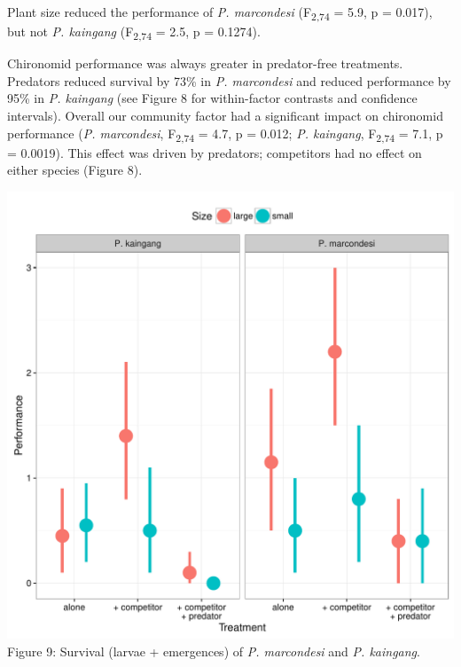 Plant size reduced the performance of \emph{P. marcondesi}
(F\textsubscript{2,74} = 5.9, p = 0.017), but not \emph{P. kaingang}
(F\textsubscript{2,74} = 2.5, p = 0.1274).

Chironomid performance was always greater in predator-free treatments.
Predators reduced survival by 73\% in \emph{P. marcondesi} and reduced
performance by 95\% in \emph{P. kaingang} (see Figure 8 for
within-factor contrasts and confidence intervals). Overall our community
factor had a significant impact on chironomid performance (\emph{P.
marcondesi}, F\textsubscript{2,74} = 4.7, p = 0.012; \emph{P. kaingang},
F\textsubscript{2,74} = 7.1, p = 0.0019). This effect was driven by
predators; competitors had no effect on either species (Figure 8).

\includegraphics[width=5.5in]{figures/anova_data.pdf}\\
Figure 9: Survival (larvae + emergences) of \emph{P. marcondesi} and
\emph{P. kaingang}.

